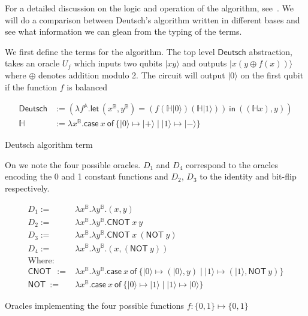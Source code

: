 \documentclass[runningheads,orivec,envcountsame,envcountsect]{llncs}
\newcommand\ket[1]{\ensuremath{|#1\rangle}}
\newcommand\AbsBasis{\ensuremath{\mathbb{A}}}
\def\Pair#1#2{(#1,#2)} %
\def\Lam#1#2#3{\lambda#1^{#2}{.}#3} %
\def\letkeyword{\mathsf{let}}
\def\inkeyword{\mathsf{in}}
\def\LetP#1#2#3#4#5#6{\letkeyword\,\Pair{#1^{#2}}{#3^{#4}}=#5~\inkeyword~#6}
\def\case#1#2#3#4#5{\ensuremath{\mathsf{case}~#1~\mathsf{of}~\{#2\mapsto #4 \mid #3\mapsto #5\}}}
\newcommand\B{\mathbb B}
\newcommand\Hd{\mathbb{H}}
\newcommand{\cnot}[2]{\mathsf{CNOT}\ #1\ #2}
\newcommand{\pauliX}[1]{\mathsf{NOT}\ #1}
\begin{document}
For a detailed discussion on the logic and operation of the algorithm, see~\cite{Deutsch1992RapidSO}. We will do a comparison between Deutsch's algorithm written in different bases and see what information we can glean from the typing of the terms.

We first define the terms for the algorithm. The top level $\mathsf{Deutsch}$ abstraction, takes an oracle $U_f$  which inputs two qubits $\ket{x y}$ and outputs $\ket{x (y\oplus f(x))}$ where $\oplus$ denotes addition modulo 2. The circuit will output $\ket{0}$ on the first qubit if the function $f$ is balanced 
\begin{table}
    \small
    \begin{align*}
        \mathsf{Deutsch} &:= 
        (\Lam{{f}}{\AbsBasis}{
                \LetP{x}{\B}{y}{\B}
                {(f (\Hd \ket{0}) (\Hd \ket{1}))}
                {\Pair{(\Hd x)}{y}}
        })\\
        \Hd &:= \Lam{x}{\B}{\case{x}{\ket{0}}{\ket{1}}{\ket{+}}{\ket{-}}}
    \end{align*}
    \caption{Deutsch algorithm term}
\end{table}

On  we note the four possible oracles. $D_1$ and $D_4$ correspond to the oracles encoding the 0 and 1 constant functions and $D_2$, $D_3$ to the identity and bit-flip respectively.

\begin{table}
    \scriptsize
    \begin{align*}
        D_1 :=& \Lam{x}{\B}{\Lam{y}{\B}{\Pair{x}{y}}}\\
        D_2 :=& \Lam{x}{\B}{\Lam{y}{\B}{\cnot{x}{y}}}\\
        D_3 :=& \Lam{x}{\B}{\Lam{y}{\B}{\cnot{x}{(\pauliX{y})}}}\\
        D_4 :=& \Lam{x}{\B}{\Lam{y}{\B}{\Pair{x}{(\pauliX{y})}}}\\
        \text{Where:} &\\
        \cnot{}{} :=& \Lam{x}{\B}{\Lam{y}{\B}{
        \case{x}
        {\ket{0}}{\ket{1}}
        {\Pair{\ket{0}}{y}}{\Pair{\ket{1}}{\pauliX{y}}}}}\\
        \pauliX{} :=& \Lam{x}{\B}{\case{x}{\ket{0}}{\ket{1}}{\ket{1}}{\ket{0}}}
    \end{align*}
    
    \caption{Oracles implementing the four possible functions $f:\{0,1\}\mapsto\{0,1\}$}
    \label{tab:Oracles}
\end{table}
\end{document}
